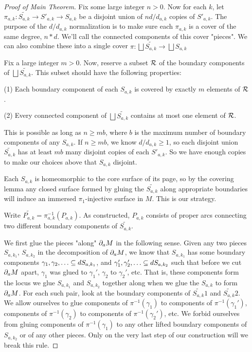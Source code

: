 \begin{proof}[Proof of Main Theorem]
Fix some large integer $n>0$. Now for each $k$, let $\pi_{a,k}
\colon \widetilde{S_{a,k}} \to S'_{a,k} \to S_{a,k}$ be a disjoint union of $nd/d_{a,k}$
copies of $S'_{a,k}$. The purpose of the $d/d_{a,k}$ normalization is to make sure
each $\pi_{a,k}$ is a cover of the same degree, $n*d$.  We'll call the connected
components of this cover "pieces". We can also combine these into a single
cover $\pi \colon \bigsqcup \widetilde{S_{a,k}} \to \bigsqcup S_{a,k}$

Fix a large integer $m>0$. Now, reserve a subset $\mathcal{R}$ of the boundary
components of $\bigsqcup \widetilde{S_{a,k}}$.  This subset should have the following
properties:

(1) Each boundary component of each $S_{a,k}$ is covered by exactly $m$ elements
of $\mathcal{R}$.

(2) Every connected component of $\bigsqcup \widetilde{S_{a,k}}$ contains at most one element
of $\mathcal{R}$.

This is possible as long as $n \geq mb$, where $b$ is the maximum number of
boundary components of any $S_{a,k}$. If $n\geq mb$, we know $d/d_{a,k} \geq
1$, so each disjoint union $\widetilde{S_{a,k}}$ has at least $mb$ many
disjoint copies of each $S'_{a,k}$.  So we have enough copies to make our choices
above that $S_{a,k}$ disjoint.

Each $S_{a,k}$ is homeomorphic to the core surface of its page, so by the covering
lemma any closed surface formed by gluing the $\widetilde{S_{a,k}}$ along appropriate
boundaries will induce an immersed $\pi_1$-injective surface in $M$. This is
our strategy.

Write $\widetilde{P_{a,k}}=\pi_{a,k}^{-1}(P_{a,k})$. As constructed, $P_{a,k}$ consists of proper arcs
connecting two different boundary components of $\widetilde{S_{a,k}}$.

We first glue the pieces "along" $\partial_aM$ in the following sense. Given any two
pieces $S_{a,k_1}$, $S_{a,k_2}$ in the decomposition of $\partial_aM$, we know that
$S_{a,k_1}$ has some boundary components $\gamma_1,\gamma_2,\dots \cin
dS_{a,k_1}$, and $\gamma_1',\gamma_2',\dots \cin dS_{a,k_2}$ such that before we
cut $\partial_aM$ apart, $\gamma_1$ was glued to $\gamma_1'$, $\gamma_2$ to
$\gamma_2'$, etc.  That is, these components form the locus we glue $S_{a,k_1}$
and $S_{a,k_2}$ together along when we glue the $S_{a,k}$ to form $\partial_aM$.  For
each such pair, look at the boundary components of $\widetilde{S_{a,k}}1$ and
$\widetilde{S_{a,k}}2$.  We allow ourselves to glue components of
$\pi^{-1}(\gamma_1)$ to components of $\pi^{-1}(\gamma_1')$, components of
$\pi^{-1}(\gamma_2)$ to components of $\pi^{-1}(\gamma_2')$, etc. We forbid
ourselves from gluing components of $\pi^{-1}(\gamma_1)$ to any other lifted
boundary components of $S_{a,k_2}$ or of any other pieces. Only on the very last
step of our construction will we break this rule.


\end{proof}
